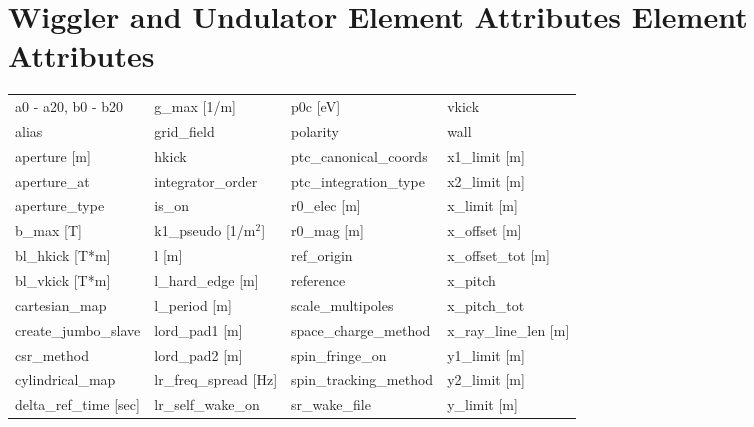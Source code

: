  \section{Wiggler and Undulator Element Attributes Element Attributes}
 \label{s:list.wiggler}
 
 \begin{tabular}{llll} \toprule
a0 - a20, b0 - b20             & g_max [1/m]                    & p0c [eV]                       & vkick                          \\
alias                          & grid_field                     & polarity                       & wall                           \\
aperture [m]                   & hkick                          & ptc_canonical_coords           & x1_limit [m]                   \\
aperture_at                    & integrator_order               & ptc_integration_type           & x2_limit [m]                   \\
aperture_type                  & is_on                          & r0_elec [m]                    & x_limit [m]                    \\
b_max [T]                      & k1_pseudo [1/m$^2$]            & r0_mag [m]                     & x_offset [m]                   \\
bl_hkick [T*m]                 & l [m]                          & ref_origin                     & x_offset_tot [m]               \\
bl_vkick [T*m]                 & l_hard_edge [m]                & reference                      & x_pitch                        \\
cartesian_map                  & l_period [m]                   & scale_multipoles               & x_pitch_tot                    \\
create_jumbo_slave             & lord_pad1 [m]                  & space_charge_method            & x_ray_line_len [m]             \\
csr_method                     & lord_pad2 [m]                  & spin_fringe_on                 & y1_limit [m]                   \\
cylindrical_map                & lr_freq_spread [Hz]            & spin_tracking_method           & y2_limit [m]                   \\
delta_ref_time [sec]           & lr_self_wake_on                & sr_wake_file                   & y_limit [m]                    \\

\end{tabular}
